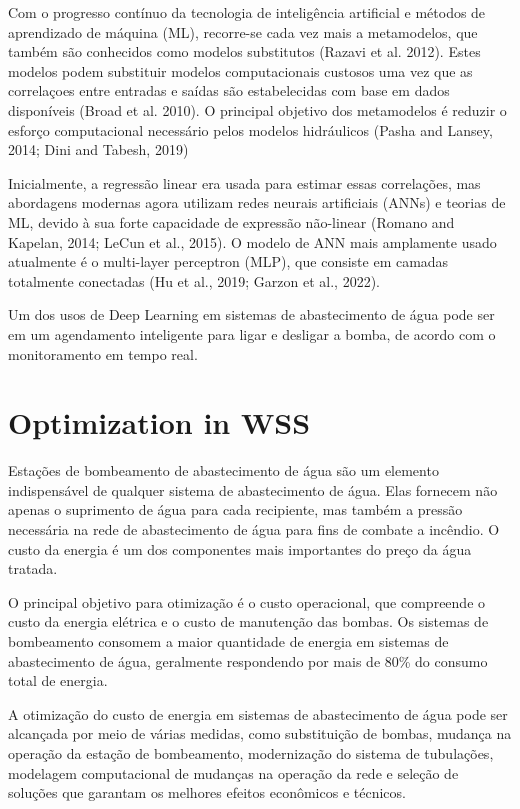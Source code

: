 Com o progresso contínuo da tecnologia de inteligência artificial e métodos de aprendizado de máquina (ML), 
recorre-se cada vez mais a metamodelos, que também são conhecidos como modelos substitutos (Razavi et al. 2012). Estes modelos podem substituir modelos computacionais custosos uma vez que as correlaçoes entre entradas e saídas são estabelecidas com base em dados disponíveis (Broad et al. 2010). O principal objetivo dos metamodelos é reduzir o esforço computacional necessário pelos modelos hidráulicos (Pasha and Lansey, 2014; Dini and Tabesh, 2019)

Inicialmente, a regressão linear era usada para estimar essas correlações, mas abordagens modernas agora utilizam redes neurais artificiais (ANNs) e teorias de ML, devido à sua forte capacidade de expressão não-linear (Romano and Kapelan, 2014; LeCun et al., 2015). O modelo de ANN mais amplamente usado atualmente é o multi-layer perceptron (MLP), que consiste em camadas totalmente conectadas (Hu et al., 2019; Garzon et al., 2022).







Um dos usos de Deep Learning em sistemas de abastecimento de água pode ser em um agendamento inteligente para ligar e desligar a bomba, de acordo com o monitoramento em tempo real.\cite{}



\section{Optimization in WSS}

Estações de bombeamento de abastecimento de água são um elemento indispensável de qualquer sistema de abastecimento de água. Elas fornecem não apenas o suprimento de água para cada recipiente, mas também a pressão necessária na rede de abastecimento de água para fins de combate a incêndio. O custo da energia é um dos componentes mais importantes do preço da água tratada.\cite{rfc7}

O principal objetivo para otimização é o custo operacional, que compreende o custo da energia elétrica e o custo de manutenção das bombas.\cite{rfc2} Os sistemas de bombeamento consomem a maior quantidade de energia em sistemas de abastecimento de água, geralmente respondendo por mais de 80\% do consumo total de energia.\cite{rfc8}

A otimização do custo de energia em sistemas de abastecimento de água pode ser alcançada por meio de várias medidas, como substituição de bombas, mudança na operação da estação de bombeamento, modernização do sistema de tubulações, modelagem computacional de mudanças na operação da rede e seleção de soluções que garantam os melhores efeitos econômicos e técnicos.\cite{rfc7}

